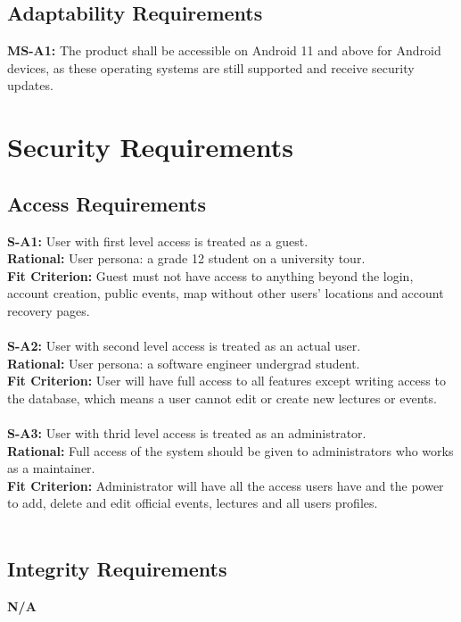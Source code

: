 \documentclass[12pt]{article}
\begin{document}
\subsection{Adaptability Requirements}
  \textbf{MS-A1:} The product shall be accessible on Android 11 and above for Android devices, as these operating systems are still supported and receive security updates.\\

\section{Security Requirements}
\subsection{Access Requirements}
  \textbf{S-A1:} User with first level access is treated as a guest.\\
\textbf{Rational:} User persona: a grade 12 student on a university tour.\\
\textbf{Fit Criterion:} Guest must not have access to anything beyond the login, account creation, public events, map without other users' locations and account recovery pages. \\\\
\textbf{S-A2:} User with second level access is treated as an actual user.\\
\textbf{Rational:} User persona: a software engineer undergrad student.\\
\textbf{Fit Criterion:} User will have full access to all features except writing access to the database, which means a user cannot edit or create new lectures or events. \\\\
\textbf{S-A3:} User with thrid level access is treated as an administrator.\\
\textbf{Rational:} Full access of the system should be given to administrators who works as a maintainer.\\
\textbf{Fit Criterion:} Administrator will have all the access users have and the power to add, delete and edit official events, lectures and all users profiles.\\\\
\subsection{Integrity Requirements}
  \textbf{N/A}\\
\end{document}
